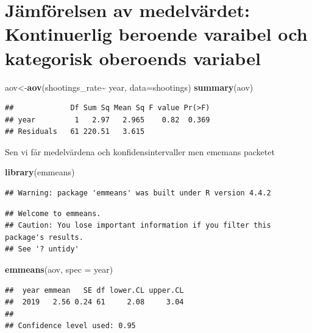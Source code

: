 \documentclass[
]{book}
\newenvironment{Shaded}{\begin{snugshade}}{\end{snugshade}}
\newcommand{\AttributeTok}[1]{\textcolor[rgb]{0.13,0.29,0.53}{#1}}
\newcommand{\FunctionTok}[1]{\textcolor[rgb]{0.13,0.29,0.53}{\textbf{#1}}}
\newcommand{\NormalTok}[1]{#1}
\newcommand{\OtherTok}[1]{\textcolor[rgb]{0.56,0.35,0.01}{#1}}
\newcommand{\SpecialCharTok}[1]{\textcolor[rgb]{0.81,0.36,0.00}{\textbf{#1}}}
\newcommand{\StringTok}[1]{\textcolor[rgb]{0.31,0.60,0.02}{#1}}
\begin{document}
\section{Jämförelsen av medelvärdet: Kontinuerlig beroende varaibel och kategorisk oberoends variabel}\label{juxe4mfuxf6relsen-av-medelvuxe4rdet-kontinuerlig-beroende-varaibel-och-kategorisk-oberoends-variabel}

\begin{Shaded}
\begin{Highlighting}[]
\NormalTok{aov}\OtherTok{\textless{}{-}}\FunctionTok{aov}\NormalTok{(shootings\_rate}\SpecialCharTok{\textasciitilde{}}\NormalTok{ year, }\AttributeTok{data=}\NormalTok{shootings)}
\FunctionTok{summary}\NormalTok{(aov)}
\end{Highlighting}
\end{Shaded}

\begin{verbatim}
##             Df Sum Sq Mean Sq F value Pr(>F)
## year         1   2.97   2.965    0.82  0.369
## Residuals   61 220.51   3.615
\end{verbatim}

Sen vi får medelvärdena och konfidensintervaller men ememans packetet

\begin{Shaded}
\begin{Highlighting}[]
\FunctionTok{library}\NormalTok{(emmeans)}
\end{Highlighting}
\end{Shaded}

\begin{verbatim}
## Warning: package 'emmeans' was built under R version 4.4.2
\end{verbatim}

\begin{verbatim}
## Welcome to emmeans.
## Caution: You lose important information if you filter this package's results.
## See '? untidy'
\end{verbatim}

\begin{Shaded}
\begin{Highlighting}[]
\FunctionTok{emmeans}\NormalTok{(aov, }\AttributeTok{spec =} \StringTok{\textquotesingle{}year\textquotesingle{}}\NormalTok{)}
\end{Highlighting}
\end{Shaded}

\begin{verbatim}
##  year emmean   SE df lower.CL upper.CL
##  2019   2.56 0.24 61     2.08     3.04
## 
## Confidence level used: 0.95
\end{verbatim}
\end{document}
